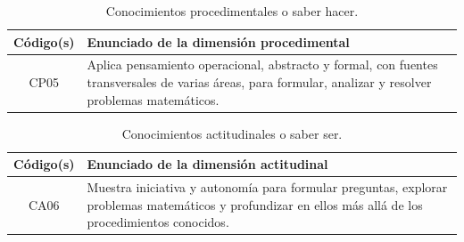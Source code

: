 
\begin{table}[H]
\centering
\renewcommand{\arraystretch}{1.3}
\begin{tabular}{|c|p{9cm}|}
\hline
\cellcolor[HTML]{00C0F3}\textbf{Código(s)}  & \cellcolor[HTML]{00C0F3}\textbf{Enunciado de la dimensión procedimental} \\
\hline
CP05 & Aplica pensamiento operacional, abstracto y formal, con fuentes transversales de varias áreas, para formular, analizar y resolver problemas matemáticos. \\
\hline
\end{tabular}
\caption{Conocimientos procedimentales o saber hacer.}
\label{tab:procedimental-egreso-integrada}
\end{table}


\begin{table}[H]
\centering
\renewcommand{\arraystretch}{1.3}
\begin{tabular}{|c|p{9cm}|}
\hline
\cellcolor[HTML]{00C0F3}\textbf{Código(s)} & \cellcolor[HTML]{00C0F3}\textbf{Enunciado de la dimensión actitudinal} \\
\hline
CA06 & Muestra iniciativa y autonomía para formular preguntas, explorar problemas matemáticos y profundizar en ellos más allá de los procedimientos conocidos.\\
\hline
\end{tabular}
\caption{Conocimientos actitudinales o saber ser.}
\label{tab:actitudinal-egreso-integrada}
\end{table}
